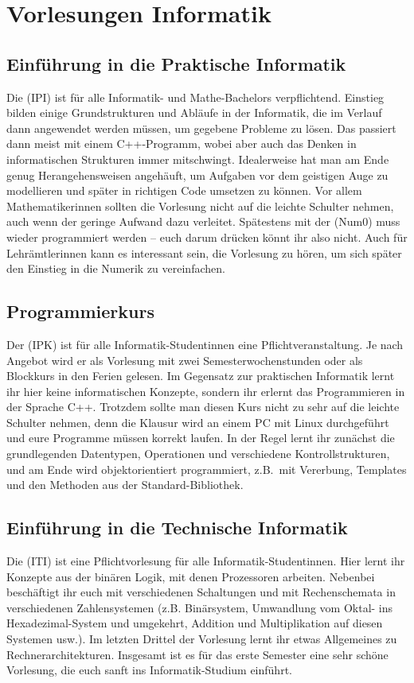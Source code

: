 \section*{Vorlesungen Informatik}

\subsection{Einführung in die Praktische Informatik}
\label{info1}
Die  (\gls{IPI}) ist für alle Informatik- und Mathe-Bachelors verpflichtend. Einstieg bilden einige Grundstrukturen und Abläufe in der Informatik, die im Verlauf dann angewendet werden müssen, um gegebene Probleme zu lösen. Das passiert dann meist mit einem C++-Programm, wobei aber auch das Denken in informatischen Strukturen immer mitschwingt. Idealerweise hat man am Ende genug Herangehensweisen angehäuft, um Aufgaben vor dem geistigen Auge zu modellieren und später in richtigen Code umsetzen zu können. Vor allem Mathematikerinnen sollten die Vorlesung nicht auf die leichte Schulter nehmen, auch wenn der geringe Aufwand dazu verleitet. Spätestens mit der  (\gls{Num0}) muss wieder programmiert werden -- euch darum drücken könnt ihr also nicht. Auch für Lehrämtlerinnen kann es interessant sein, die Vorlesung zu hören, um sich später den Einstieg in die Numerik zu vereinfachen.

\subsection{Programmierkurs}
\label{ipk}
Der  (\gls{IPK}) ist für alle Informatik-Studentinnen eine Pflichtveranstaltung. Je nach Angebot wird er als Vorlesung mit zwei Semesterwochenstunden oder als Blockkurs in den Ferien gelesen. Im Gegensatz zur praktischen Informatik lernt ihr hier keine informatischen Konzepte, sondern ihr erlernt das Programmieren in der Sprache C++. Trotzdem sollte man diesen Kurs nicht zu sehr auf die leichte Schulter nehmen, denn die Klausur wird an einem PC mit Linux durchgeführt und eure Programme müssen korrekt laufen. In der Regel lernt ihr zunächst die grundlegenden Datentypen, Operationen und verschiedene Kontrollstrukturen, und am Ende wird objektorientiert programmiert, z.B.~mit Vererbung, Templates und den Methoden aus der Standard-Bibliothek.

\subsection{Einführung in die Technische Informatik}
\label{info2}
Die  (\gls{ITI}) ist eine Pflichtvorlesung für alle Informatik-Studentinnen. Hier lernt ihr Konzepte aus der binären Logik, mit denen Prozessoren arbeiten. Nebenbei beschäftigt ihr euch mit verschiedenen Schaltungen und mit Rechenschemata in verschiedenen Zahlensystemen (z.B. Binärsystem, Umwandlung vom Oktal- ins Hexadezimal-System und umgekehrt, Addition und Multiplikation auf diesen Systemen usw.). Im letzten Drittel der Vorlesung lernt ihr etwas Allgemeines zu Rechnerarchitekturen. Insgesamt ist es für das erste Semester eine sehr schöne Vorlesung, die euch sanft ins Informatik-Studium einführt.



